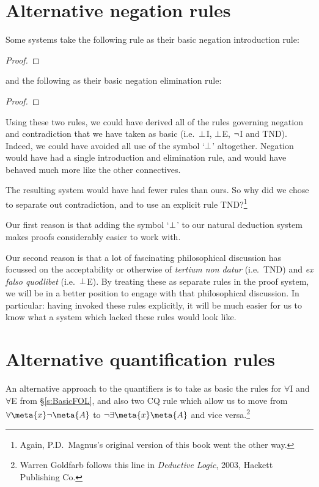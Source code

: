 \section{Alternative negation rules}
Some systems take the following rule as their basic negation introduction rule:
\begin{proof}
	\open
	\close
\end{proof}
and the following as their basic negation elimination rule:
\begin{proof}
	\open
	\close
\end{proof}
Using these two rules, we could have derived all of the rules governing negation and contradiction that we have taken as basic (i.e.\ $\bot$I, $\bot$E, $\neg$I and TND). Indeed, we could have avoided all use of the symbol `$\bot$' altogether. Negation would have had a single introduction and elimination rule, and would have behaved much more like the other connectives.

The resulting system would have had fewer rules than ours. So why did we chose to separate out contradiction, and to use an explicit rule TND?\footnote{Again, P.D.\ Magnus's original version of this book went the other way.}

Our first reason is that adding the symbol `$\bot$' to our natural deduction system makes proofs considerably easier to work with.

Our second reason is that a lot of fascinating philosophical discussion has focussed on the acceptability or otherwise of \emph{tertium non datur} (i.e.\ TND) and \emph{ex falso quodlibet} (i.e.\ $\bot$E). By treating these as separate rules in the proof system, we will be  in a better position to engage with that philosophical discussion. In particular: having invoked these rules explicitly, it will be much easier for us to know what a system which lacked these rules would look like.



\section{Alternative quantification rules}
An alternative approach to the quantifiers is to take as basic the rules for $\forall$I and $\forall$E from \S\ref{s:BasicFOL}, and also two CQ rule which allow us to move from $\forall \meta{x} \enot \meta{A}$ to $\enot \exists \meta{x} \meta{A}$ and vice versa.\footnote{Warren Goldfarb follows this line in \emph{Deductive Logic}, 2003, Hackett Publishing Co.}  

